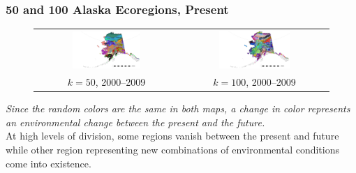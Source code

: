 \begin{frame}
 \frametitle{50 and 100 Alaska Ecoregions, Present}
 \vskip-0.15in
 \setlength{\tabcolsep}{0pt}
 \begin{figure}
   \begin{tabular}{cc}
   \includegraphics[width=0.50\textwidth]{ngee_figures/alaska_dem_Feb2012_50_2000-2009_barscale} &
   \includegraphics[width=0.50\textwidth]{ngee_figures/alaska_dem_Feb2012_100_2000-2009_barscale} \\
   $k=50$, 2000--2009 & $k=100$, 2000--2009 \\
   \end{tabular}
  \vbox{\scriptsize\hfill\citep{Hoffman_LandscapeEcol_20131001}}
  \label{fig:alaska_present_50_100}
 \end{figure}
 \vskip-0.15in
\emph{Since the random colors are the same in both maps, a change in color
represents an environmental change between the present and the future.}\\

At high levels of division, some regions vanish between the present
and future while other region representing new combinations of
environmental conditions come into existence.

\end{frame}

